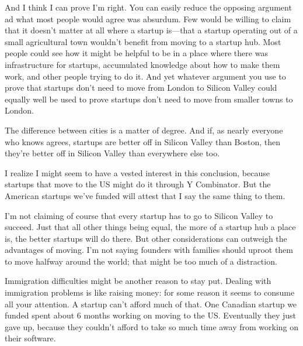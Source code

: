 And I think I can prove I'm right. You
                  can easily reduce the opposing argument ad what most people
                  would agree was absurdum. Few would be willing to claim that
                  it doesn't matter at all where a startup is---that a
                  startup operating out of a small agricultural town wouldn't
                  benefit from moving to a startup hub. Most people could see
                  how it might be helpful to be in a place where there was
                  infrastructure for startups, accumulated knowledge about how
                  to make them work, and other people trying to do it. And yet
                  whatever argument you use to prove that startups don't need to
                  move from London to Silicon Valley could equally well be used
                  to prove startups don't need to move from smaller towns to
                  London.

The difference between cities is a matter
                  of degree. And if, as nearly everyone who knows agrees,
                  startups are better off in Silicon Valley than Boston, then
                  they're better off in Silicon Valley than everywhere else
                  too.

I realize I might seem to have a vested
                  interest in this conclusion, because startups that move to the
                  US might do it through Y Combinator. But the American startups
                  we've funded will attest that I say the same thing to them.

I'm
                  not claiming of course that every startup has to go to Silicon
                  Valley to succeed. Just that all other things being equal, the
                  more of a startup hub a place is, the better startups will do
                  there. But other considerations can outweigh the advantages of
                  moving. I'm not saying founders with families should uproot
                  them to move halfway around the world; that might be too much
                  of a distraction.

Immigration difficulties might be
                  another reason to stay put. Dealing with immigration problems
                  is like raising money: for some reason it seems to consume all
                  your attention. A startup can't afford much of that. One
                  Canadian startup we funded spent about 6 months working on
                  moving to the US. Eventually they just gave up, because they
                  couldn't afford to take so much time away from working on
                  their software.

